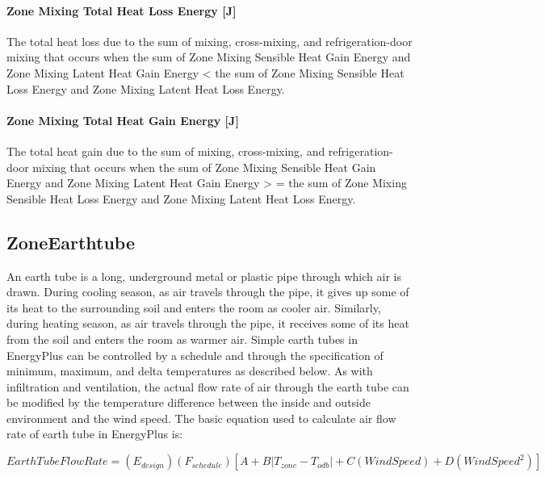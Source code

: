\paragraph{Zone Mixing Total Heat Loss Energy {[}J{]}}\label{zone-mixing-total-heat-loss-energy-j-2}

The total heat loss due to the sum of mixing, cross-mixing, and refrigeration-door mixing that occurs when the sum of Zone Mixing Sensible Heat Gain Energy and Zone Mixing Latent Heat Gain Energy \textless{} the sum of Zone Mixing Sensible Heat Loss Energy and Zone Mixing Latent Heat Loss Energy.

\paragraph{Zone Mixing Total Heat Gain Energy {[}J{]}}\label{zone-mixing-total-heat-gain-energy-j-2}

The total heat gain due to the sum of mixing, cross-mixing, and refrigeration-door mixing that occurs when the sum of Zone Mixing Sensible Heat Gain Energy and Zone Mixing Latent Heat Gain Energy \textgreater{} = the sum of Zone Mixing Sensible Heat Loss Energy and Zone Mixing Latent Heat Loss Energy.

\subsection{ZoneEarthtube}\label{zoneearthtube-earth-tube}

An earth tube is a long, underground metal or plastic pipe through which air is drawn. During cooling season, as air travels through the pipe, it gives up some of its heat to the surrounding soil and enters the room as cooler air. Similarly, during heating season, as air travels through the pipe, it receives some of its heat from the soil and enters the room as warmer air. Simple earth tubes in EnergyPlus can be controlled by a schedule and through the specification of minimum, maximum, and delta temperatures as described below. As with infiltration and ventilation, the actual flow rate of air through the earth tube can be modified by the temperature difference between the inside and outside environment and the wind speed. The basic equation used to calculate air flow rate of earth tube in EnergyPlus is:

\begin{equation}
EarthTubeFlowRate = \left( {{E_{design}}} \right)\left( {{F_{schedule}}} \right)\left[ {A + B\left| {{T_{zone}} - {T_{odb}}} \right| + C\left( {WindSpeed} \right) + D\left( {WindSpee{d^2}} \right)} \right]
\end{equation}

